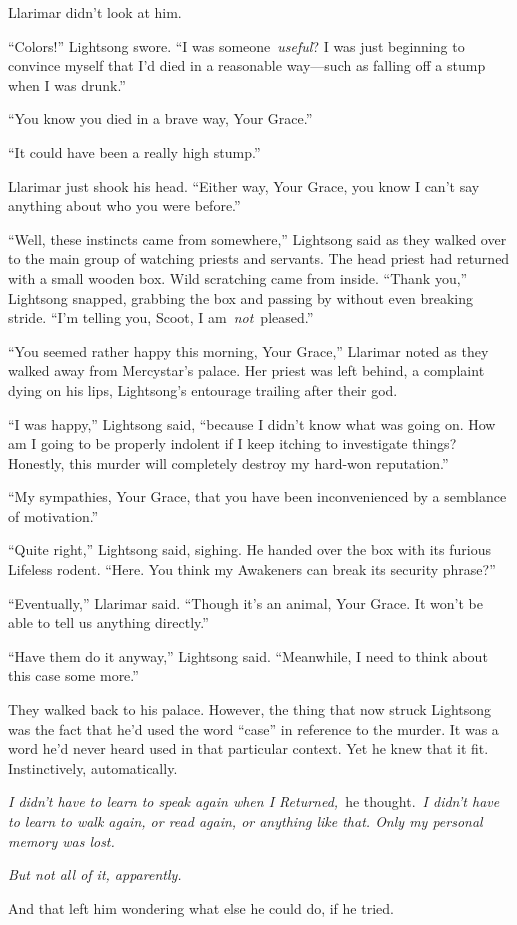 Llarimar didn’t look at him.

“Colors!” Lightsong swore. “I was someone~\textit{useful}? I was just beginning to convince myself that I’d died in a reasonable way—such as falling off a stump when I was drunk.”

“You know you died in a brave way, Your Grace.”

“It could have been a really high stump.”

Llarimar just shook his head. “Either way, Your Grace, you know I can’t say anything about who you were before.”

“Well, these instincts came from somewhere,” Lightsong said as they walked over to the main group of watching priests and servants. The head priest had returned with a small wooden box. Wild scratching came from inside. “Thank you,” Lightsong snapped, grabbing the box and passing by without even breaking stride. “I’m telling you, Scoot, I am~\textit{not}~pleased.”

“You seemed rather happy this morning, Your Grace,” Llarimar noted as they walked away from Mercystar’s palace. Her priest was left behind, a complaint dying on his lips, Lightsong’s entourage trailing after their god.

“I was happy,” Lightsong said, “because I didn’t know what was going on. How am I going to be properly indolent if I keep itching to investigate things? Honestly, this murder will completely destroy my hard-won reputation.”

“My sympathies, Your Grace, that you have been inconvenienced by a semblance of motivation.”

“Quite right,” Lightsong said, sighing. He handed over the box with its furious Lifeless rodent. “Here. You think my Awakeners can break its security phrase?”

“Eventually,” Llarimar said. “Though it’s an animal, Your Grace. It won’t be able to tell us anything directly.”

“Have them do it anyway,” Lightsong said. “Meanwhile, I need to think about this case some more.”

They walked back to his palace. However, the thing that now struck Lightsong was the fact that he’d used the word “case” in reference to the murder. It was a word he’d never heard used in that particular context. Yet he knew that it fit. Instinctively, automatically.

\textit{I didn’t have to learn to speak again when I Returned,}~he thought.~\textit{I didn’t have to learn to walk again, or read again, or anything like that. Only my personal memory was lost.}

\textit{But not all of it, apparently.}

And that left him wondering what else he could do, if he tried.

